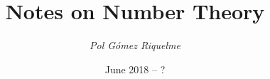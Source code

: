 \documentclass[12pt,oneside]{article}
\begin{document}
\title{Notes on Number Theory}
\author{\small\textit{Pol Gómez Riquelme}}
\date{June 2018 -- ?}
\maketitle

\tableofcontents
\pagebreak



\end{document}
